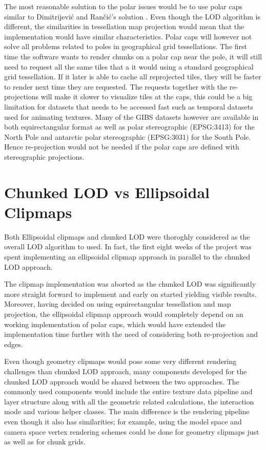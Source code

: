 The most reasonable solution to the polar issues would be to use polar caps similar to Dimitrijevi\'{c} and Ran\v{c}i\'{c}'s solution \cite{dimi15}. Even though the LOD algorithm is different, the similarities in tessellation map projection would mean that the implementation would have similar characteristics. Polar caps will however not solve all problems related to poles in geographical grid tessellations. The first time the software wants to render chunks on a polar cap near the pole, it will still need to request all the same tiles that a it would using a standard geographical grid tessellation. If it later is able to cache all reprojected tiles, they will be faster to render next time they are requested. The requests together with the re-projections will make it slower to visualize tiles at the caps, this could be a big limitation for datasets that needs to be accessed fast such as temporal datasets used for animating textures. Many of the GIBS datasets however are available in both equirectangular format as well as polar stereographic (EPSG:3413) for the North Pole and antarctic polar stereographic (EPSG:3031) for the South Pole. Hence re-projection would not be needed if the polar caps are defined with stereographic projections. 

\section{Chunked LOD vs Ellipsoidal Clipmaps}
Both Ellipsoidal clipmaps and chunked LOD were thoroghly considered as the overall LOD algorithm to used. 
In fact, the first eight weeks of the project was spent implementing an ellipsoidal clipmap approach in parallel to the chunked LOD approach.

The clipmap implementation was aborted as the chunked LOD was significantly more straight forward to implement and early on started yielding visible results. Moreover, having decided on using equirectangular tessellation and map projection, the ellipsoidal clipmap approach would completely depend on an working implementation of polar caps, which would have extended the implementation time further with the need of considering both re-projection and edges.

Even though geometry clipmaps would pose some very different rendering challenges than chunked LOD approach, many components developed for the chunked LOD approach would be shared between the two approaches.
The commonly used components would include the entire texture data pipeline and layer structure along with all the geometric related calculations, the interaction mode and various helper classes. The main difference is the rendering pipeline even though it also has similarities; for example, using the model space and camera space vertex rendering schemes could be done for geometry clipmaps just as well as for chunk grids.


